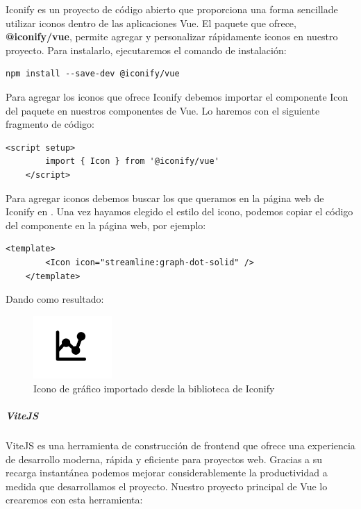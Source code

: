 Iconify es un proyecto de código abierto que proporciona una forma sencillade utilizar iconos dentro de las aplicaciones Vue. El paquete que ofrece, \textbf{@iconify/vue}, permite agregar y personalizar rápidamente iconos en nuestro proyecto. Para instalarlo, ejecutaremos el comando de instalación:

\begin{lstlisting}[style=Consola, caption={Instalación del paquete iconify},label=Consola_code]
	npm install --save-dev @iconify/vue
\end{lstlisting}

Para agregar los iconos que ofrece Iconify debemos importar el componente Icon del paquete en nuestros componentes de Vue. Lo haremos con el siguiente fragmento de código:

\begin{lstlisting}[style=PHP-color, caption={Importar el componente Icon en Vue},label=PHP-color_code]
	<script setup>
		import { Icon } from '@iconify/vue'
	</script>
\end{lstlisting}

Para agregar iconos debemos buscar los que queramos en la página web de Iconify en \citep{iconos-iconify}. Una vez hayamos elegido el estilo del icono, podemos copiar el código del componente en la página web, por ejemplo:

\begin{lstlisting}[style=PHP-color, caption={Código para agregar un icono a la página},label=PHP-color_code]
	<template>
		<Icon icon="streamline:graph-dot-solid" />
	</template>
\end{lstlisting}

Dando como resultado:
\begin{figure}[H]
    \centering
    \includegraphics[width=3cm]{archivos/tfg_jorge/icoco_grafico_iconify}
    \caption{Icono de gráfico importado desde la biblioteca de Iconify}\label{sistemass2}
\end{figure}

\subparagraph{ViteJS}
ViteJS es una herramienta de construcción de frontend que ofrece una experiencia de desarrollo moderna, rápida y eficiente para proyectos web.
Gracias a su recarga instantánea podemos mejorar considerablemente la productividad a medida que desarrollamos el proyecto. Nuestro proyecto principal de Vue lo crearemos con esta herramienta:

